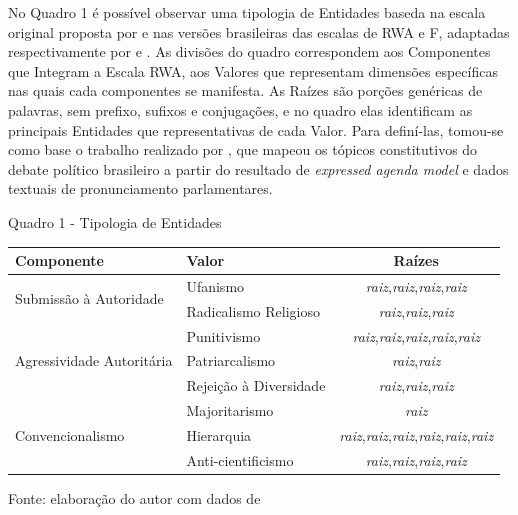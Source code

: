 \documentclass[
12pt,				%
openright,			%
twoside,			%
a4paper,			%
english,			%
french,				%
spanish,			%
brazil				%
]{abntex2}
\begin{document}
No Quadro 1 é possível observar uma tipologia de Entidades baseda na escala original proposta por  e nas versões brasileiras das escalas de RWA e F, adaptadas respectivamente por  e . As divisões do quadro correspondem aos Componentes que Integram a Escala RWA, aos Valores que representam dimensões específicas nas quais cada componentes se manifesta. As Raízes são porções genéricas de palavras, sem prefixo, sufixos e conjugações, e no quadro elas identificam as principais Entidades que representativas de cada Valor. Para definí-las, tomou-se como base o trabalho realizado por , que mapeou os tópicos constitutivos do debate político brasileiro a partir do resultado de \textit{expressed agenda model} e dados textuais de pronunciamento parlamentares.  

\begin{center}
	Quadro 1 - Tipologia de Entidades
	
	\vspace{0.4cm}
	
	\begin{tabular}{llc}
		\toprule
{Componente}								& {Valor} 					& {Raízes} \\ \midrule
\multirow{2}{*}{Submissão à Autoridade} 	& Ufanismo				& \textit{raiz},\textit{raiz},\textit{raiz},\textit{raiz} \\
& Radicalismo Religioso		& \textit{raiz},\textit{raiz},\textit{raiz} \\ \midrule
\multirow{3}{*}{Agressividade Autoritária} 	& Punitivismo 				& \textit{raiz},\textit{raiz},\textit{raiz},\textit{raiz},\textit{raiz} \\
& Patriarcalismo	 		& \textit{raiz},\textit{raiz} \\
& Rejeição à Diversidade	& \textit{raiz},\textit{raiz},\textit{raiz} \\ \midrule
\multirow{3}{*}{Convencionalismo} 			& Majoritarismo 			& \textit{raiz} \\
& Hierarquia				& \textit{raiz},\textit{raiz},\textit{raiz},\textit{raiz},\textit{raiz},\textit{raiz} \\
& Anti-cientificismo		& \textit{raiz},\textit{raiz},\textit{raiz},\textit{raiz} \\ \bottomrule
	\end{tabular}
	
	\vspace{0.6cm}
	
	Fonte: elaboração do autor com dados de  
\end{center}
\end{document}
